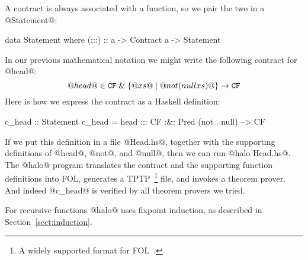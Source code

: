 A contract is always associated with a function, 
so we pair the two in a @Statement@:
\begin{code}
  data Statement where
      (:::) :: a -> Contract a -> Statement
\end{code}
In our previous mathematical notation we might write the following
contract for @head@:
$$
@head@ \in {\tt CF} \;\&\; \{@xs@ \mid @not (null xs)@ \} \rightarrow {\tt CF}
$$
Here is how we express the contract as a Haskell definition:
\begin{comment}
head (x:xs) = x
head []     = error "empty list"

not True = False    null [] = True
not False = True    null xs = False

f . g = \x -> f (g x)
\end{comment}
\begin{code}
c_head :: Statement
c_head = head ::: CF :&: Pred (not . null) --> CF
\end{code}
If we put this definition in a file @Head.hs@, together with the supporting
definitions of @head@, @not@, and @null@, 
then we can run @halo Head.hs@. 
The @halo@ program translates the contract and the supporting function
definitions into
FOL, generates a TPTP~\footnote{A  widely supported format for FOL~\citep{SS98}.} file, 
and invokes a theorem prover.
And indeed @c_head@ is verified by all theorem provers we tried.

For recursive functions @halo@ uses fixpoint induction, as
described in Section~\ref{sect:induction}.


